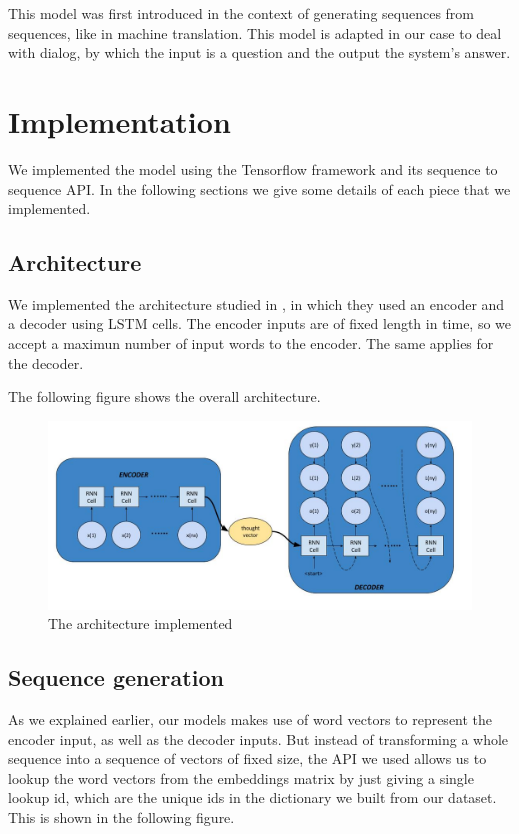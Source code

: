\documentclass{llncs}
\begin{document}
This model was first introduced in the context of generating sequences from sequences, like in machine translation. This model is adapted in our case to deal with dialog, by which the input is a question and the output the system's answer.

\section{Implementation}

We implemented the model using the Tensorflow framework and its sequence to sequence API. In the following sections we give some details of each piece that we implemented.

\subsection{Architecture}

We implemented the architecture studied in \cite{neuralConversation}, in which they used an encoder and a decoder using LSTM cells. The encoder inputs are of fixed length in time, so we accept a maximun number of input words to the encoder. The same applies for the decoder.

The following figure shows the overall architecture.

\begin{figure}[H]
    \centering
    \includegraphics[scale=0.4]{../_img/img_seq2seq.jpg}
    \caption{The architecture implemented}
    \label{fig:img_seq2seq}
\end{figure}

\subsection{Sequence generation}

As we explained earlier, our models makes use of word vectors to represent the encoder input, as well as the decoder inputs. But instead of transforming a whole sequence into a sequence of vectors of fixed size, the API we used allows us to lookup the word vectors from the embeddings matrix by just giving a single lookup id, which are the unique ids in the dictionary we built from our dataset. This is shown in the following figure.
\end{document}
